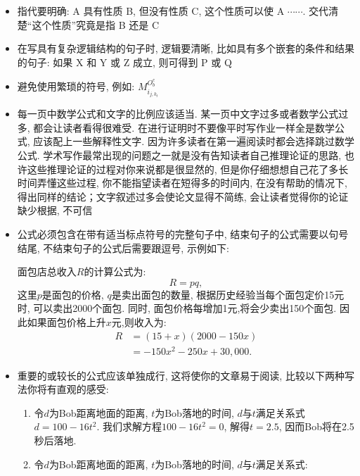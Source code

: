 \documentclass{formatBook}
\begin{document}
\begin{itemize}
    \item 指代要明确: A 具有性质 B, 但没有性质 C, 这个性质可以使 A $\cdots\cdots$. 交代清楚“这个性质”究竟是指 B 还是 C
    \item 在写具有复杂逻辑结构的句子时, 逻辑要清晰, 比如具有多个嵌套的条件和结果的句子: 如果 X 和 Y 或 Z 成立, 则可得到 P 或 Q
    \item 避免使用繁琐的符号, 例如: $M_{i_{j, k_{t}}}^{O_{b}^{c}}$
    \item 每一页中数学公式和文字的比例应该适当. 某一页中文字过多或者数学公式过多, 都会让读者看得很难受. 在进行证明时不要像平时写作业一样全是数学公式, 应该配上一些解释性文字. 因为许多读者在第一遍阅读时都会选择跳过数学公式. 学术写作最常出现的问题之一就是没有告知读者自己推理论证的思路, 也许这些推理论证的过程对你来说都是很显然的, 但是你仔细想想自己花了多长时间弄懂这些过程, 你不能指望读者在短得多的时间内, 在没有帮助的情况下, 得出同样的结论；文字叙述过多会使论文显得不简练, 会让读者觉得你的论证缺少根据, 不可信
    \item 公式必须包含在带有适当标点符号的完整句子中, 结束句子的公式需要以句号结尾, 不结束句子的公式后需要跟逗号, 示例如下: \par
          面包店总收入$R$的计算公式为: 
          \begin{equation*}
              R=pq,
          \end{equation*}
          这里$p$是面包的价格, $q$是卖出面包的数量, 根据历史经验当每个面包定价15元时, 可以卖出2000个面包. 同时, 面包价格每增加1元,将会少卖出150个面包. 因此如果面包价格上升$x$元,则收入为: 
          \begin{equation*}
              \begin{split}
                  R&=(15+x)(2000-150x)\\
                  &=-150x^{2}-250x+30,000.
              \end{split}
          \end{equation*}
    \item 重要的或较长的公式应该单独成行, 这将使你的文章易于阅读, 比较以下两种写法你将有直观的感受: 
          \begin{enumerate}
              \item 令$d$为Bob距离地面的距离, $t$为Bob落地的时间, $d$与$t$满足关系式$d = 100 − 16t^{2}$. 我们求解方程$100 − 16t^{2} = 0$, 解得$t =2.5$, 因而Bob将在2.5秒后落地. 
              \item 令$d$为Bob距离地面的距离, $t$为Bob落地的时间, $d$与$t$满足关系式: 
                    \begin{equation*}

\end{equation*}
\end{enumerate}
\end{itemize}
\end{document}
